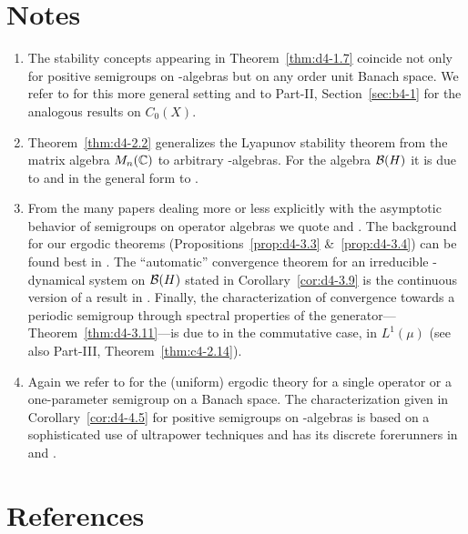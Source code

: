 \section*{Notes}\label{notes:d4-notes}
\begin{enumerate}[label=\emph{Section 4.\arabic*:}, wide, itemsep=1ex]
\item
The stability concepts appearing in Theorem~\ref{thm:d4-1.7} coincide not only for positive semigroups on \CA-algebras but on any order unit Banach space.
We refer to \textcite{battyrobinson:1984} for this more general setting and to Part-II, Section~\ref{sec:b4-1} for the analogous results on $ C_{0}(X) $.


\item
Theorem~\ref{thm:d4-2.2} generalizes the Lyapunov stability theorem from the matrix algebra $ M_{n}(\mathbb{C}) $  to arbitrary \WA-algebras.
For the algebra $ \mathcal{B}(H) $  it is due to \textcite{milstein:1975} and in the general form to \textcite{grohneubrander:1981}.


\item
From the many papers dealing more or less explicitly with the asymptotic behavior of semigroups on operator algebras we quote \textcite{frigerioverri:1982} and \textcite{watanabe:1982}.
The background for our ergodic theorems (Propositions~\ref{prop:d4-3.3} \&~\ref{prop:d4-3.4}) can be found best in \textcite{krengel:1985}.
The \enquote{automatic} convergence theorem for an irreducible \WA-dynamical system on $ \mathcal{B}(H) $  stated in Corollary~\ref{cor:d4-3.9} is the continuous version of a result in \textcite{groh:1984c}.
Finally, the characterization of convergence towards a periodic semigroup through spectral properties of the generator---Theorem~\ref{thm:d4-3.11}---is due to \textcite{nagel:1984} in the commutative case, \ie in $ L^{1}(\mu) $ (see also Part-III, Theorem~\ref{thm:c4-2.14}).

\item
Again we refer to \textcite{krengel:1985} for the (uniform) ergodic theory for a single operator or a one-parameter semigroup on a Banach space.
The characterization given in Corollary~\ref{cor:d4-4.5} for positive semigroups on \WA-algebras is based on a sophisticated use of ultrapower techniques and has its discrete forerunners in \textcite{lotz:1981} and 
\textcite{groh:1984b}.
\end{enumerate}
\section*{References}
{\RaggedRight
  \printbibliography[heading=none]
 }

